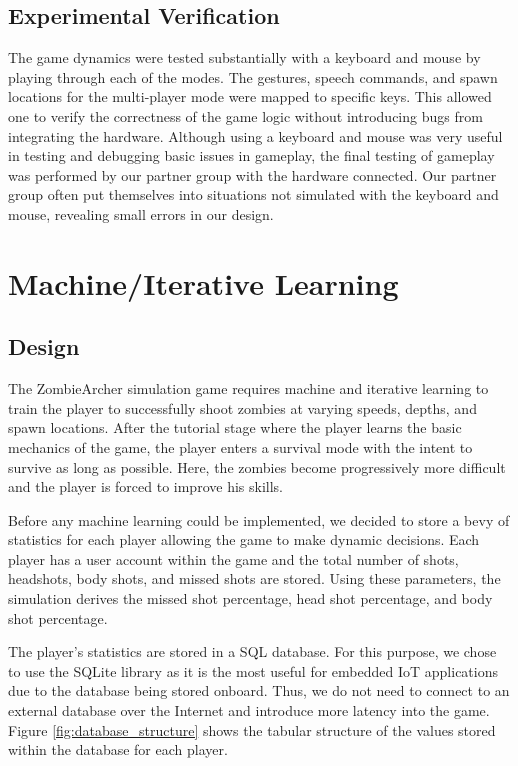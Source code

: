 \documentclass[titlepage, 12pt]{scrartcl}
\begin{document}
    \subsection{Experimental Verification}
    The game dynamics were tested substantially with a keyboard and mouse by playing through each of the modes. The gestures, speech commands, and spawn locations for the multi-player mode were mapped to specific keys. This allowed one to verify the correctness of the game logic without introducing bugs from integrating the hardware. Although using a keyboard and mouse was very useful in testing and debugging basic issues in gameplay, the final testing of gameplay was performed by our partner group with the hardware connected. Our partner group often put themselves into situations not simulated with the keyboard and mouse, revealing small errors in our design. 
    
    \section{Machine/Iterative Learning}
    \subsection{Design}
    The ZombieArcher simulation game requires machine and iterative learning to train the player to successfully shoot zombies at varying speeds, depths, and spawn locations. After the tutorial stage where the player learns the basic mechanics of the game, the player enters a survival mode with the intent to survive as long as possible. Here, the zombies become progressively more difficult and the player is forced to improve his skills. 
    \par
    Before any machine learning could be implemented, we decided to store a bevy of statistics for each player allowing the game to make dynamic decisions. Each player has a user account within the game and the total number of shots, headshots, body shots, and missed shots are stored. Using these parameters, the simulation derives the missed shot percentage, head shot percentage, and body shot percentage.
	\par
	The player’s statistics are stored in a SQL database. For this purpose, we chose to use the SQLite library as it is the most useful for embedded IoT applications due to the database being stored onboard. Thus, we do not need to connect to an external database over the Internet and introduce more latency into the game. Figure \ref{fig:database_structure} shows the tabular structure of the values stored within the database for each player.
	
\end{document}
